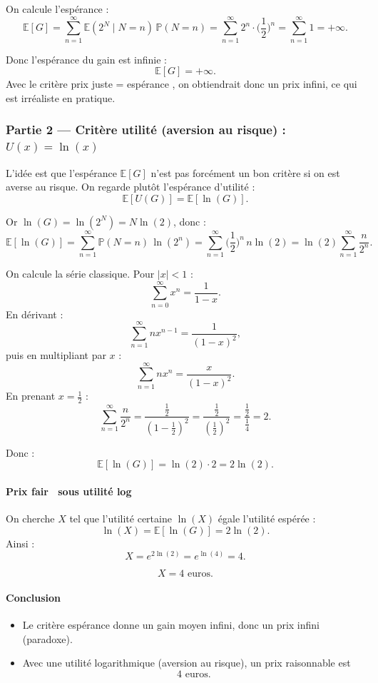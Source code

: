 On calcule l'espérance :
\[
\mathbb{E}[G]
=\sum_{n=1}^{\infty}\mathbb{E}(2^N\mid N=n)\,\mathbb{P}(N=n)
=\sum_{n=1}^{\infty}2^n\cdot \Big(\frac12\Big)^n
=\sum_{n=1}^{\infty}1
=+\infty.
\]

Donc l'espérance du gain est infinie :
\[
\boxed{\mathbb{E}[G]=+\infty.}
\]
Avec le critère \og prix juste = espérance \fg, on obtiendrait donc un prix infini, ce qui est irréaliste en pratique.

\subsubsection*{Partie 2 — Critère utilité (aversion au risque) : $U(x)=\ln(x)$}

L'idée est que l'espérance $\mathbb{E}[G]$ n'est pas forcément un bon critère si on est averse au risque.
On regarde plutôt l'espérance d'utilité :
\[
\mathbb{E}[U(G)] = \mathbb{E}[\ln(G)].
\]

Or $\ln(G)=\ln(2^N)=N\ln(2)$, donc :
\[
\mathbb{E}[\ln(G)]
=\sum_{n=1}^{\infty}\mathbb{P}(N=n)\,\ln(2^n)
=\sum_{n=1}^{\infty}\Big(\frac12\Big)^n\, n\ln(2)
=\ln(2)\sum_{n=1}^{\infty}\frac{n}{2^n}.
\]

On calcule la série classique. Pour $|x|<1$ :
\[
\sum_{n=0}^{\infty}x^n=\frac{1}{1-x}.
\]
En dérivant :
\[
\sum_{n=1}^{\infty}n x^{n-1}=\frac{1}{(1-x)^2},
\]
puis en multipliant par $x$ :
\[
\sum_{n=1}^{\infty}n x^{n}=\frac{x}{(1-x)^2}.
\]
En prenant $x=\frac12$ :
\[
\sum_{n=1}^{\infty}\frac{n}{2^n}
=\frac{\frac12}{(1-\frac12)^2}
=\frac{\frac12}{(\frac12)^2}
=\frac{\frac12}{\frac14}=2.
\]

Donc :
\[
\mathbb{E}[\ln(G)] = \ln(2)\cdot 2 = 2\ln(2).
\]

\paragraph{Prix \og fair \fg\ sous utilité log}
On cherche $X$ tel que l'utilité certaine $\ln(X)$ égale l'utilité espérée :
\[
\ln(X)=\mathbb{E}[\ln(G)]=2\ln(2).
\]
Ainsi :
\[
X=e^{2\ln(2)}=e^{\ln(4)}=4.
\]

\[
\boxed{X=4\text{ euros}.}
\]

\paragraph{Conclusion}
\begin{itemize}
\item Le critère espérance donne un gain moyen infini, donc un prix infini (paradoxe).
\item Avec une utilité logarithmique (aversion au risque), un prix raisonnable est
\[
\boxed{4\text{ euros}.}
\]
\end{itemize}

